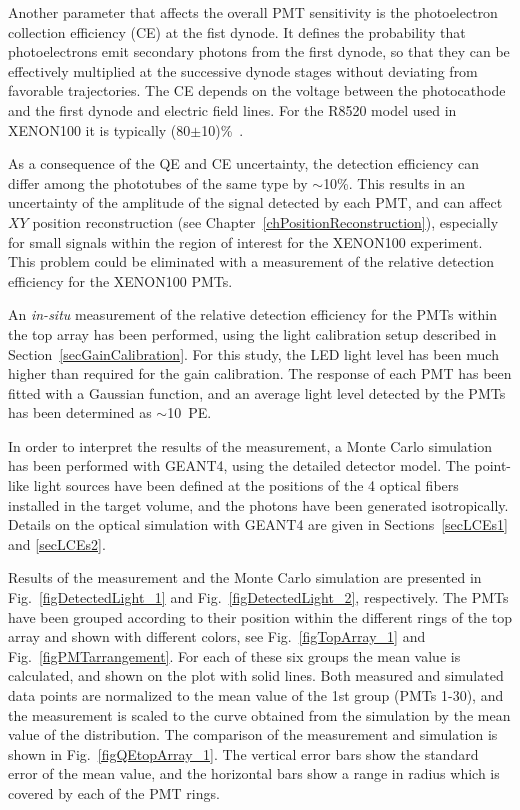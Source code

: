 Another parameter that affects the overall PMT sensitivity is the photoelectron collection efficiency (CE) at the fist dynode. It defines the probability that photoelectrons emit secondary photons from the first dynode, so that they can be effectively multiplied at the successive dynode stages without deviating from favorable trajectories. The CE depends on the voltage between the photocathode and the first dynode and electric field lines. For the R8520 model used in XENON100 it is typically (80$\pm$10)\%~\cite{PMTmassModel}.

As a consequence of the QE and CE uncertainty, the detection efficiency can differ among the phototubes of the same type by $\sim$10\%. This results in an uncertainty of the amplitude of the signal detected by each PMT, and can affect $XY$ position reconstruction (see Chapter~\ref{chPositionReconstruction}), especially for small signals within the region of interest for the XENON100 experiment. This problem could be eliminated with a measurement of the relative detection efficiency for the XENON100 PMTs.

An {\it in-situ} measurement of the relative detection efficiency for the PMTs within the top array has been performed, using the light calibration setup described in Section~\ref{secGainCalibration}.  For this study, the LED light level has been much higher than required for the gain calibration. The response of each PMT has been fitted with a Gaussian function, and an average light level detected by the PMTs has been determined as $\sim$10~PE. 

In order to interpret the results of the measurement, a Monte Carlo simulation has been performed with GEANT4, using the detailed detector model. The point-like light sources have been defined at the positions of the 4 optical fibers installed in the target volume, and the photons have been generated isotropically. Details on the optical simulation with GEANT4 are given in Sections~\ref{secLCEs1} and \ref{secLCEs2}.

Results of the measurement and the Monte Carlo simulation are presented in Fig.~\ref{figDetectedLight_1} and Fig.~\ref{figDetectedLight_2}, respectively. The PMTs have been grouped according to their position within the different rings of the top array and shown with different colors, see Fig.~\ref{figTopArray_1} and Fig.~\ref{figPMTarrangement}.  For each of these six groups the mean value is calculated, and shown on the plot with solid lines. Both measured and simulated data points are normalized to the mean value of the 1st group (PMTs 1-30), and the measurement is scaled to the curve obtained from the simulation by the mean value of the distribution. The comparison of the measurement and simulation is shown in Fig.~\ref{figQEtopArray_1}. 
The vertical error bars show the standard error of the mean value, and the horizontal bars show a range in radius which is covered by each of the PMT rings. 

